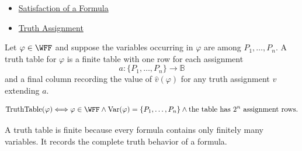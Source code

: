\begin{dependencies}
\begin{itemize}
  \item \hyperref[def:satisfaction-propositional-formula]{Satisfaction of a Formula}
  \item \hyperref[def:truth-assignment-propositional-logic]{Truth Assignment}
\end{itemize}
\end{dependencies}
\begin{tcolorbox}[colback=propbox, colframe=propborder, arc=2pt,
  left=6pt, right=6pt, top=4pt, bottom=4pt,
  title={\small\textbf{Definition (Truth Table)}},
  fonttitle=\small\bfseries]
\begin{definition}
\label{def:truth-table-propositional-logic}
Let \(\varphi\in\WFF\) and suppose the variables occurring in \(\varphi\) are among \(P_1,\ldots,P_n\). A truth table for \(\varphi\) is a finite table with one row for each assignment
\[
a:\{P_1,\ldots,P_n\}\to\mathbb{B}
\]
and a final column recording the value of \(\widehat v(\varphi)\) for any truth assignment \(v\) extending \(a\).
\end{definition}
\end{tcolorbox}

\begin{remark*}
\[
\operatorname{TruthTable}(\varphi)
\Longleftrightarrow
\varphi\in\WFF
\land
\operatorname{Var}(\varphi)=\{P_1,\ldots,P_n\}
\land
\text{the table has }2^n\text{ assignment rows}.
\]
\end{remark*}

\begin{remark*}[Interpretation]
A truth table is finite because every formula contains only finitely many variables. It records the complete truth behavior of a formula.
\end{remark*}

